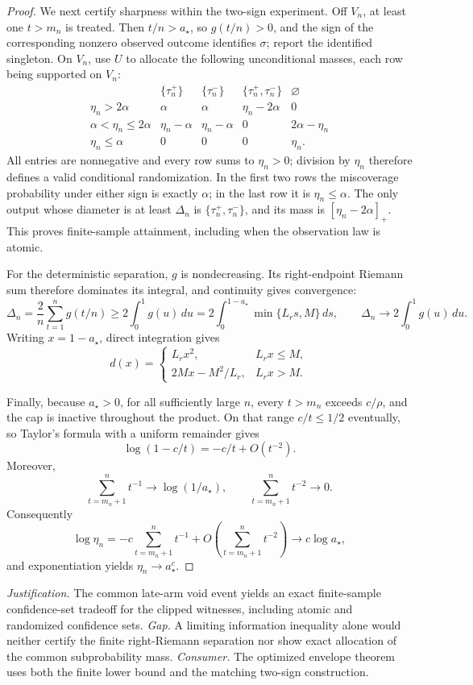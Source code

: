 \documentclass{article}
\begin{document}
\begin{proof}
We next certify sharpness within the two-sign experiment.  Off \(V_n\), at least one \(t>m_n\) is treated.  Then \(t/n>a_\star\), so \(g(t/n)>0\), and the sign of the corresponding nonzero observed outcome identifies \(\sigma\); report the identified singleton.  On \(V_n\), use \(U\) to allocate the following unconditional masses, each row being supported on \(V_n\):
\[
\begin{array}{c|cccc}
 &\{\tau_n^+\}&\{\tau_n^-\}&\{\tau_n^+,\tau_n^-\}&\varnothing\\ \hline
 \eta_n>2\alpha
   &\alpha&\alpha&\eta_n-2\alpha&0\\
 \alpha<\eta_n\le2\alpha
   &\eta_n-\alpha&\eta_n-\alpha&0&2\alpha-\eta_n\\
 \eta_n\le\alpha
   &0&0&0&\eta_n.
\end{array}
\]
All entries are nonnegative and every row sums to \(\eta_n>0\); division by \(\eta_n\) therefore defines a valid conditional randomization.  In the first two rows the miscoverage probability under either sign is exactly \(\alpha\); in the last row it is \(\eta_n\le\alpha\).  The only output whose diameter is at least \(\Delta_n\) is \(\{\tau_n^+,\tau_n^-\}\), and its mass is \([\eta_n-2\alpha]_+\).  This proves finite-sample attainment, including when the observation law is atomic.

For the deterministic separation, \(g\) is nondecreasing.  Its right-endpoint Riemann sum therefore dominates its integral, and continuity gives convergence:
\[
 \Delta_n=\frac2n\sum_{t=1}^n g(t/n)
 \ge2\int_0^1g(u)\,du
 =2\int_0^{1-a_\star}\min\{L_rs,M\}\,ds,
 \qquad
 \Delta_n\longrightarrow2\int_0^1g(u)\,du.
\]
Writing \(x=1-a_\star\), direct integration gives
\[
 d(x)=
 \begin{cases}
 L_rx^2,&L_rx\le M,\\
 2Mx-M^2/L_r,&L_rx>M.
 \end{cases}
\]

Finally, because \(a_\star>0\), for all sufficiently large \(n\), every \(t>m_n\) exceeds \(c/\rho\), and the cap is inactive throughout the product.  On that range \(c/t\le1/2\) eventually, so Taylor's formula with a uniform remainder gives
\[
 \log(1-c/t)=-c/t+O(t^{-2}).
\]
Moreover,
\[
 \sum_{t=m_n+1}^n t^{-1}\longrightarrow\log(1/a_\star),
 \qquad
 \sum_{t=m_n+1}^n t^{-2}\longrightarrow0.
\]
Consequently
\[
 \log\eta_n
 =-c\sum_{t=m_n+1}^n t^{-1}
   +O\!\left(\sum_{t=m_n+1}^n t^{-2}\right)
 \longrightarrow c\log a_\star,
\]
and exponentiation yields \(\eta_n\to a_\star^c\).
\end{proof}
\par\smallskip\noindent \textit{Justification.} The common late-arm void event yields an exact finite-sample confidence-set tradeoff for the clipped witnesses, including atomic and randomized confidence sets. \textit{Gap.} A limiting information inequality alone would neither certify the finite right-Riemann separation nor show exact allocation of the common subprobability mass. \textit{Consumer.} The optimized envelope theorem uses both the finite lower bound and the matching two-sign construction.
\end{document}
